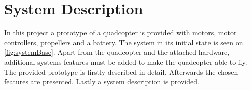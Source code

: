 \chapter{System Description}\label{cha:Systemdescription}
In this project a prototype of a quadcopter is provided with motors, motor controllers, propellers and a battery. The system in its initial state is seen on \autoref{fig:systemBase}. Apart from the quadcopter and the attached hardware, additional systems features must be added to make the quadcopter able to fly. The provided prototype is firstly described in detail. Afterwards the chosen features are presented. Lastly a system description is provided.   



%
